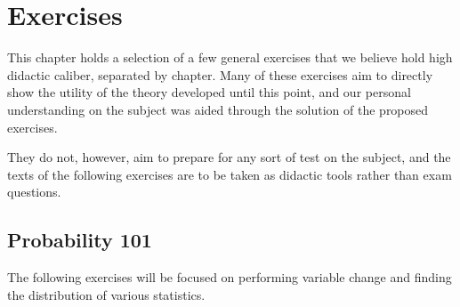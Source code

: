 \chapter{Exercises}
This chapter holds a selection of a few general exercises that we believe hold high didactic caliber, separated by chapter. Many of these exercises aim to directly show the utility of the theory developed until this point, and our personal understanding on the subject was aided through the solution of the proposed exercises. 

They do not, however, aim to prepare for any sort of test on the subject, and the texts of the following exercises are to be taken as didactic tools rather than exam questions.


\clearpage
\section{Probability 101}\label{exer:probability_101}

The following exercises will be focused on performing variable change and finding the distribution of various statistics.

